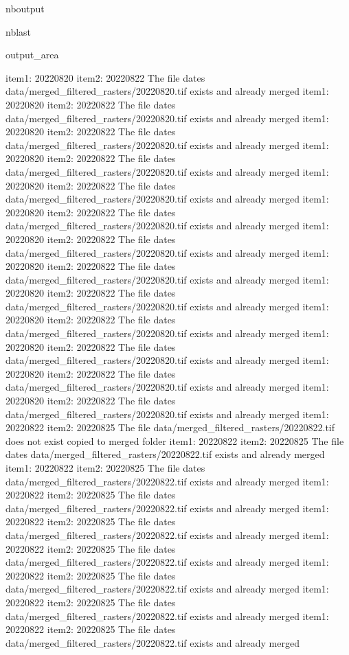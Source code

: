 \documentclass[letterpaper,10pt]{sphinxmanual}
\begin{document}
\begin{sphinxuseclass}{nboutput}
\begin{sphinxuseclass}{nblast}
{\begin{sphinxuseclass}{output_area}
\begin{sphinxuseclass}{}
\begin{sphinxVerbatim}[commandchars=\\\{\}]
item1:  20220820
item2:  20220822
The file dates data/merged\_filtered\_rasters/20220820.tif exists and already merged
item1:  20220820
item2:  20220822
The file dates data/merged\_filtered\_rasters/20220820.tif exists and already merged
item1:  20220820
item2:  20220822
The file dates data/merged\_filtered\_rasters/20220820.tif exists and already merged
item1:  20220820
item2:  20220822
The file dates data/merged\_filtered\_rasters/20220820.tif exists and already merged
item1:  20220820
item2:  20220822
The file dates data/merged\_filtered\_rasters/20220820.tif exists and already merged
item1:  20220820
item2:  20220822
The file dates data/merged\_filtered\_rasters/20220820.tif exists and already merged
item1:  20220820
item2:  20220822
The file dates data/merged\_filtered\_rasters/20220820.tif exists and already merged
item1:  20220820
item2:  20220822
The file dates data/merged\_filtered\_rasters/20220820.tif exists and already merged
item1:  20220820
item2:  20220822
The file dates data/merged\_filtered\_rasters/20220820.tif exists and already merged
item1:  20220820
item2:  20220822
The file dates data/merged\_filtered\_rasters/20220820.tif exists and already merged
item1:  20220820
item2:  20220822
The file dates data/merged\_filtered\_rasters/20220820.tif exists and already merged
item1:  20220820
item2:  20220822
The file dates data/merged\_filtered\_rasters/20220820.tif exists and already merged
item1:  20220820
item2:  20220822
The file dates data/merged\_filtered\_rasters/20220820.tif exists and already merged
item1:  20220822
item2:  20220825
The file data/merged\_filtered\_rasters/20220822.tif does not exist copied to merged folder
item1:  20220822
item2:  20220825
The file dates data/merged\_filtered\_rasters/20220822.tif exists and already merged
item1:  20220822
item2:  20220825
The file dates data/merged\_filtered\_rasters/20220822.tif exists and already merged
item1:  20220822
item2:  20220825
The file dates data/merged\_filtered\_rasters/20220822.tif exists and already merged
item1:  20220822
item2:  20220825
The file dates data/merged\_filtered\_rasters/20220822.tif exists and already merged
item1:  20220822
item2:  20220825
The file dates data/merged\_filtered\_rasters/20220822.tif exists and already merged
item1:  20220822
item2:  20220825
The file dates data/merged\_filtered\_rasters/20220822.tif exists and already merged
item1:  20220822
item2:  20220825
The file dates data/merged\_filtered\_rasters/20220822.tif exists and already merged
item1:  20220822
item2:  20220825
The file dates data/merged\_filtered\_rasters/20220822.tif exists and already merged

\end{sphinxVerbatim}
\end{sphinxuseclass}
\end{sphinxuseclass}}
\end{sphinxuseclass}
\end{sphinxuseclass}
\end{document}
